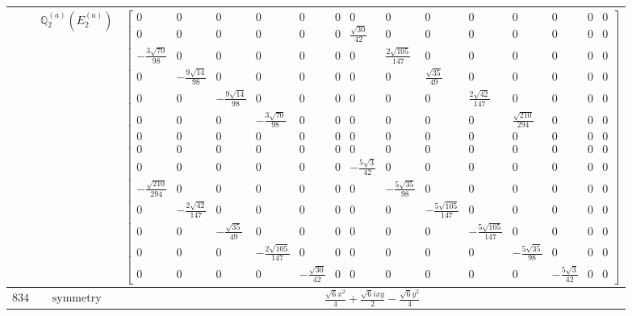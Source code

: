 \documentclass[fleqn,8pt,landscape]{jsarticle}
\begin{document}
\begin{longtable}{ccc}
$  $ & $ \mathbb{Q}_{2}^{(a)}(E_{2}^{(a)}) $ & $ \begin{bmatrix} 0 & 0 & 0 & 0 & 0 & 0 & 0 & 0 & 0 & 0 & 0 & 0 & 0 & 0 \\ 0 & 0 & 0 & 0 & 0 & 0 & \frac{\sqrt{30}}{42} & 0 & 0 & 0 & 0 & 0 & 0 & 0 \\ - \frac{3 \sqrt{70}}{98} & 0 & 0 & 0 & 0 & 0 & 0 & \frac{2 \sqrt{105}}{147} & 0 & 0 & 0 & 0 & 0 & 0 \\ 0 & - \frac{9 \sqrt{14}}{98} & 0 & 0 & 0 & 0 & 0 & 0 & \frac{\sqrt{35}}{49} & 0 & 0 & 0 & 0 & 0 \\ 0 & 0 & - \frac{9 \sqrt{14}}{98} & 0 & 0 & 0 & 0 & 0 & 0 & \frac{2 \sqrt{42}}{147} & 0 & 0 & 0 & 0 \\ 0 & 0 & 0 & - \frac{3 \sqrt{70}}{98} & 0 & 0 & 0 & 0 & 0 & 0 & \frac{\sqrt{210}}{294} & 0 & 0 & 0 \\ 0 & 0 & 0 & 0 & 0 & 0 & 0 & 0 & 0 & 0 & 0 & 0 & 0 & 0 \\ 0 & 0 & 0 & 0 & 0 & 0 & 0 & 0 & 0 & 0 & 0 & 0 & 0 & 0 \\ 0 & 0 & 0 & 0 & 0 & 0 & - \frac{5 \sqrt{3}}{42} & 0 & 0 & 0 & 0 & 0 & 0 & 0 \\ - \frac{\sqrt{210}}{294} & 0 & 0 & 0 & 0 & 0 & 0 & - \frac{5 \sqrt{35}}{98} & 0 & 0 & 0 & 0 & 0 & 0 \\ 0 & - \frac{2 \sqrt{42}}{147} & 0 & 0 & 0 & 0 & 0 & 0 & - \frac{5 \sqrt{105}}{147} & 0 & 0 & 0 & 0 & 0 \\ 0 & 0 & - \frac{\sqrt{35}}{49} & 0 & 0 & 0 & 0 & 0 & 0 & - \frac{5 \sqrt{105}}{147} & 0 & 0 & 0 & 0 \\ 0 & 0 & 0 & - \frac{2 \sqrt{105}}{147} & 0 & 0 & 0 & 0 & 0 & 0 & - \frac{5 \sqrt{35}}{98} & 0 & 0 & 0 \\ 0 & 0 & 0 & 0 & - \frac{\sqrt{30}}{42} & 0 & 0 & 0 & 0 & 0 & 0 & - \frac{5 \sqrt{3}}{42} & 0 & 0 \end{bmatrix} $ \\ \hline
$ 834 $ & $ \text{symmetry} $ & $ \frac{\sqrt{6} x^{2}}{4} + \frac{\sqrt{6} i x y}{2} - \frac{\sqrt{6} y^{2}}{4} $ \\

\end{longtable}
\end{document}
